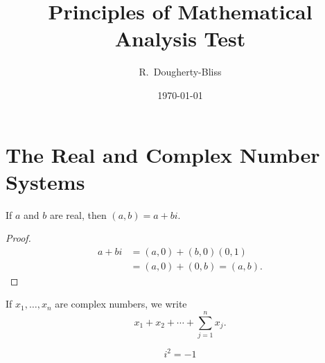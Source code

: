 \documentclass{rudin}
\title{Principles of Mathematical Analysis Test}
\author{R.~Dougherty-Bliss}
\date{\today}
\begin{document}
\maketitle

\section{The Real and Complex Number Systems}
\label{sec:the_real_and_complex_number_systems}

\begin{thm}
    If $a$ and $b$ are real, then $(a, b) = a + bi$.
\end{thm}

\begin{proof}
    \begin{align*}
        a + bi &= (a, 0) + (b, 0) (0, 1) \\
               &= (a, 0) + (0, b) = (a, b).
    \end{align*}
\end{proof}

\begin{notate}
    If $x_1, \dots, x_n$ are complex numbers, we write
    \[
        x_1 + x_2 + \cdots + \sum_{j = 1}^n x_j.
    \]
\end{notate}

\begin{equation}
    i^2 = -1
\end{equation}
\end{document}
